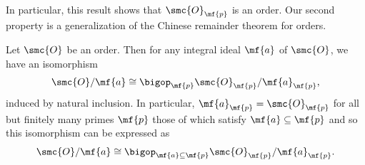     In particular, this result shows that \(\smc{O}_{\mf{p}}\) is an order. Our second property is a generalization of the Chinese remainder theorem for orders. 

    \begin{proposition}\label{prop:localized_Chinese_remainder_theorem}
      Let \(\smc{O}\) be an order. Then for any integral ideal \(\mf{a}\) of \(\smc{O}\), we have an isomorphism
      \[
        \smc{O}/\mf{a} \cong \bigop_{\mf{p}}\smc{O}_{\mf{p}}/\mf{a}_{\mf{p}},
      \]
      induced by natural inclusion. In particular, \(\mf{a}_{\mf{p}} = \smc{O}_{\mf{p}}\) for all but finitely many primes \(\mf{p}\) those of which satisfy \(\mf{a} \subseteq \mf{p}\) and so this isomorphism can be expressed as
      \[
        \smc{O}/\mf{a} \cong \bigop_{\mf{a} \subseteq \mf{p}}\smc{O}_{\mf{p}}/\mf{a}_{\mf{p}}.
      \]
    \end{proposition}
